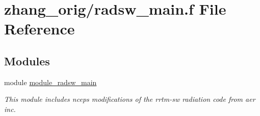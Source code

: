 \hypertarget{zhang__orig_2radsw__main_8f}{}\section{zhang\+\_\+orig/radsw\+\_\+main.f File Reference}
\label{zhang__orig_2radsw__main_8f}
\subsection*{Modules}
\begin{DoxyCompactItemize}
\item 
module \hyperlink{namespacemodule__radsw__main}{module\+\_\+radsw\+\_\+main}
\begin{DoxyCompactList}\small\item\em This module includes ncep\textquotesingle{}s modifications of the rrtm-\/sw radiation code from aer inc. \end{DoxyCompactList}\end{DoxyCompactItemize}
